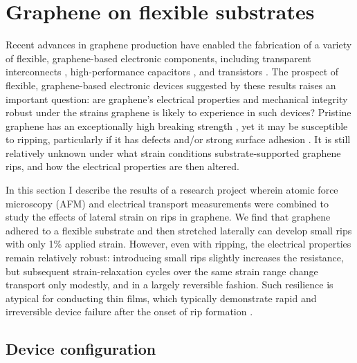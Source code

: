 \documentclass[edeposit,fullpage,draftthesis]{uiucthesis2009}
\begin{document}
\section{Graphene on flexible substrates}
Recent advances in graphene production \cite{Kim2009, Bae2010, Lee2010} have enabled the fabrication of a variety of flexible, graphene-based electronic components, including transparent interconnects \cite{Kim2011}, high-performance capacitors \cite{El-Kady2012}, and transistors \cite{Lee2011}. The prospect of flexible, graphene-based electronic devices suggested by these results raises an important question: are graphene's electrical properties and mechanical integrity robust under the strains graphene is likely to experience in such devices? Pristine graphene has an exceptionally high breaking strength \cite{Lee2008}, yet it may be susceptible to ripping, particularly if it has defects \cite{Kim2012} and/or strong  surface adhesion \cite{Sen2010}. It is still relatively unknown under what strain conditions substrate-supported graphene rips, and how the electrical properties are then altered.

In this section I describe the results of a research project wherein atomic force microscopy (AFM) and electrical transport measurements were combined to study the effects of lateral strain on rips in graphene. We find that graphene adhered to a flexible substrate and then stretched laterally can develop small rips with only 1\% applied strain. However, even with ripping, the electrical properties remain relatively robust: introducing small rips slightly increases the resistance, but subsequent strain-relaxation cycles over the same strain range change transport only modestly, and in a largely reversible fashion. Such resilience is atypical for conducting thin films, which typically demonstrate rapid and irreversible device failure after the onset of rip formation \cite{Cairns2000,Fortunato2002}.

    \subsection{Device configuration}
    
\end{document}
